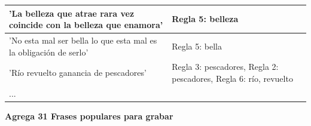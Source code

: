 \documentclass[mathserif]{beamer}%
\begin{document}
\begin{frame}
\begin{longtable}{| p{} || p{} |}
		'La belleza que atrae rara vez coincide con la belleza que enamora' & Regla 5: belleza  \\ \hline
		'No esta mal ser bella lo que esta mal es la obligación de serlo' & Regla 5: bella \\ \hline
		'Río revuelto ganancia de pescadores' & Regla 3: pescadores, Regla 2: pescadores, Regla 6: río, revuelto  \\ \hline
%		
		... & \\ \hline
		\end{longtable}
		
		\textbf{Agrega 31 Frases populares para grabar}
\end{frame}
\end{document}
